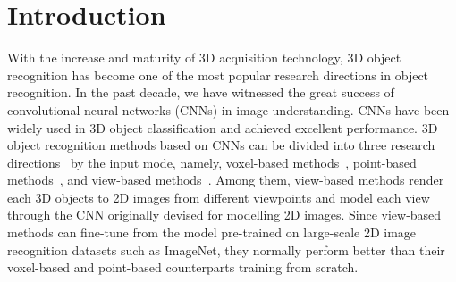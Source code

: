 \documentclass[11pt]{article}
\begin{document}
\section{Introduction}
With the increase and maturity of 3D acquisition technology, 3D object recognition has become one of the most popular research directions in object recognition. In the past decade, we have witnessed the great success of convolutional neural networks (CNNs) in image understanding. CNNs have been widely used in 3D object classification and achieved excellent performance. 3D object recognition methods based on CNNs can be divided into three research directions~\citep{yang2019learning} by the input mode, namely, voxel-based methods~\citep{wu20153d,qi2016volumetric}, point-based methods~\citep{qi2017pointnet,qi2017pointnet++}, and view-based methods~\citep{wang2017dominant,feng2018gvcnn,kanezaki2018rotationnet,han2019seqview2seqlabels,han20193d2seqvies,wei2020view}. Among them, view-based methods render each 3D objects to 2D images from different viewpoints and model each view through the CNN originally devised for modelling 2D images. Since view-based methods can fine-tune from the model pre-trained on large-scale 2D image recognition datasets such as ImageNet, they normally perform better than their voxel-based and point-based counterparts training from scratch.
\end{document}
